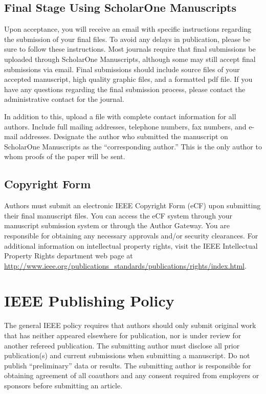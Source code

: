 \documentclass[journal,twoside,web]{ieeecolor2}
\begin{document}
\subsection{Final Stage Using ScholarOne Manuscripts}
Upon acceptance, you will receive an email with specific instructions 
regarding the submission of your final files.
To avoid any delays in 
publication, please be sure to follow these instructions.
Most journals 
require that final submissions be uploaded through ScholarOne Manuscripts, 
although some may still accept final submissions via email.
Final 
submissions should include source files of your accepted manuscript, high 
quality graphic files, and a formatted pdf file.
If you have any questions 
regarding the final submission process, please contact the administrative 
contact for the journal.


In addition to this, upload a file with complete contact information for all 
authors.
Include full mailing addresses, telephone numbers, fax numbers, and 
e-mail addresses.
Designate the author who submitted the manuscript on 
ScholarOne Manuscripts as the ``corresponding author.'' This is the only 
author to whom proofs of the paper will be sent.


\subsection{Copyright Form}
Authors must submit an electronic IEEE Copyright Form (eCF) upon submitting 
their final manuscript files.
You can access the eCF system through your 
manuscript submission system or through the Author Gateway.
You are 
responsible for obtaining any necessary approvals and/or security 
clearances.
For additional information on intellectual property rights, 
visit the IEEE Intellectual Property Rights department web page at 
\underline{http://www.ieee.org/publications\_standards/publications/rights/}\discretionary{}{}{}\underline{index.html}.


\section{IEEE Publishing Policy}
The general IEEE policy requires that authors should only submit original 
work that has neither appeared elsewhere for publication, nor is under 
review for another refereed publication.
The submitting author must disclose 
all prior publication(s) and current submissions when submitting a 
manuscript.
Do not publish ``preliminary'' data or results.
The submitting 
author is responsible for obtaining agreement of all coauthors and any 
consent required from employers or sponsors before submitting an article.
\end{document}
